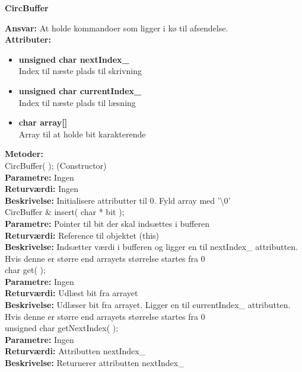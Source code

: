 %
%
{\centering
\textbf{CircBuffer}\par
}
\textbf{Ansvar:} At holde kommandoer som ligger i kø til afsendelse. \\
\textbf{Attributer:}
\begin{itemize}
	\item \textbf{unsigned char nextIndex\_} \\
	Index til næste plads til skrivning
	\item \textbf{unsigned char currentIndex\_} \\
	Index til næste plads til læsning
	\item \textbf{char array[]} \\
	Array til at holde bit karakterende
\end{itemize}

\textbf{Metoder:} \\
CircBuffer( ); (Constructor)\\
\textbf{Parametre:} Ingen \\
\textbf{Returværdi:} Ingen \\
\textbf{Beskrivelse:} Initialisere attributter til 0. Fyld array med '\textbackslash 0' \\

CircBuffer \& insert( char * bit ); \\
\textbf{Parametre:} Pointer til bit der skal indsættes i bufferen \\
\textbf{Returværdi:} Reference til objektet (this) \\
\textbf{Beskrivelse:} Indsætter værdi i bufferen og ligger en til nextIndex\_ attributten. Hvis denne er større end arrayets størrelse startes fra 0\\

char get( ); \\
\textbf{Parametre:} Ingen \\
\textbf{Returværdi:} Udlæst bit fra arrayet \\
\textbf{Beskrivelse:} Udlæser bit fra arrayet. Ligger en til currentIndex\_ attributten. Hvis denne er større end arrayets størrelse startes fra 0\\

unsigned char getNextIndex( ); \\
\textbf{Parametre:} Ingen \\
\textbf{Returværdi:} Attributten nextIndex\_ \\
\textbf{Beskrivelse:} Returnerer attributten nextIndex\_ \\

